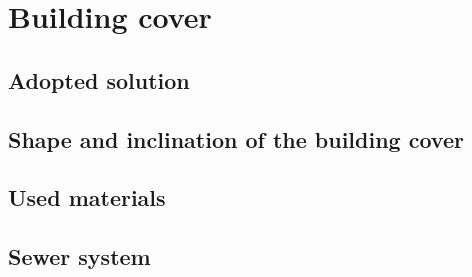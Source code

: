 \chapter{Building cover}
	
	\section{Adopted solution}
	
	\section{Shape and inclination of the building cover}
		
	\section{Used materials}
		
	\section{Sewer system}